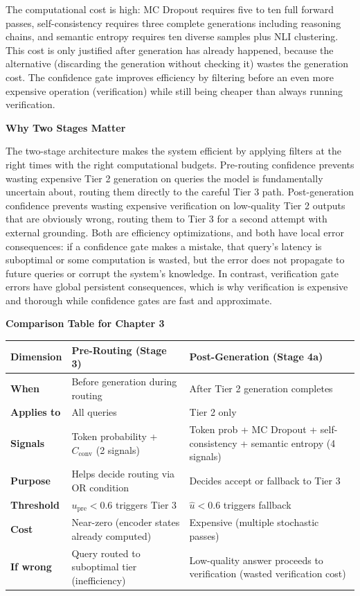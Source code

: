 \documentclass[11pt,a4paper]{article}
\newcommand{\Cconv}{C_{\text{conv}}}
\newcommand{\uhat}{\hat{u}}
\newcommand{\upre}{u_{\text{pre}}}
\begin{document}
{The computational cost is high: MC Dropout requires five to ten full forward passes, self-consistency requires three complete generations including reasoning chains, and semantic entropy requires ten diverse samples plus NLI clustering. This cost is only justified after generation has already happened, because the alternative (discarding the generation without checking it) wastes the generation cost. The confidence gate improves efficiency by filtering before an even more expensive operation (verification) while still being cheaper than always running verification.

\textbf{Why Two Stages Matter}

The two-stage architecture makes the system efficient by applying filters at the right times with the right computational budgets. Pre-routing confidence prevents wasting expensive Tier 2 generation on queries the model is fundamentally uncertain about, routing them directly to the careful Tier 3 path. Post-generation confidence prevents wasting expensive verification on low-quality Tier 2 outputs that are obviously wrong, routing them to Tier 3 for a second attempt with external grounding. Both are efficiency optimizations, and both have local error consequences: if a confidence gate makes a mistake, that query's latency is suboptimal or some computation is wasted, but the error does not propagate to future queries or corrupt the system's knowledge. In contrast, verification gate errors have global persistent consequences, which is why verification is expensive and thorough while confidence gates are fast and approximate.

\textbf{Comparison Table for Chapter 3}

\begin{center}
\small
\begin{tabular}{lp{5.5cm}p{5.5cm}}
\toprule
\textbf{Dimension} & \textbf{Pre-Routing (Stage 3)} & \textbf{Post-Generation (Stage 4a)} \\
\midrule
\textbf{When} & Before generation during routing & After Tier 2 generation completes \\
\textbf{Applies to} & All queries & Tier 2 only \\
\textbf{Signals} & Token probability + $\Cconv$ (2 signals) & Token prob + MC Dropout + self-consistency + semantic entropy (4 signals) \\
\textbf{Purpose} & Helps decide routing via OR condition & Decides accept or fallback to Tier 3 \\
\textbf{Threshold} & $\upre < 0.6$ triggers Tier 3 & $\uhat < 0.6$ triggers fallback \\
\textbf{Cost} & Near-zero (encoder states already computed) & Expensive (multiple stochastic passes) \\
\textbf{If wrong} & Query routed to suboptimal tier (inefficiency) & Low-quality answer proceeds to verification (wasted verification cost) \\
\bottomrule
\end{tabular}
\end{center}

}
\end{document}
